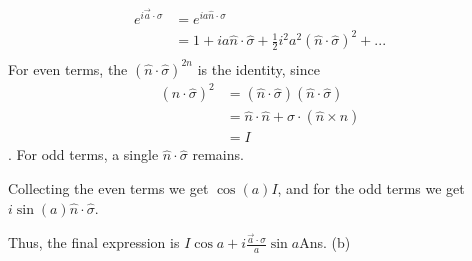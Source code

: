 \documentclass[12pt]{article}
\begin{document}
\begin{align*}
e^{i\vec a \cdot \sigma}&=e^{ia\hat n \cdot \sigma}\\
&=1+ ia\hat n \cdot\hat \sigma + \frac12i^2a^2 (\hat n \cdot\hat \sigma)^2 + ...\\
\end{align*}
For even terms, the  $(\hat n \cdot\hat \sigma)^{2n}$ is the identity, since \begin{align*}(\hat n \cdot\hat \sigma)^{2}&=(\hat n \cdot\hat \sigma)(\hat n \cdot\hat \sigma)\\ &= \hat n\cdot\hat n + \sigma\cdot (\hat n \times\hat n)\\&=I\end{align*}. For odd terms, a single $\hat n \cdot\hat \sigma$ remains.

Collecting the even terms we get $\cos (a) I$, and for the odd terms we get $i\sin(a)\hat n \cdot\hat \sigma$.

Thus, the final expression is $I\cos a + i\frac{\vec a \cdot \sigma}{a}\sin a$\hfill Ans. (b)
\end{document}
